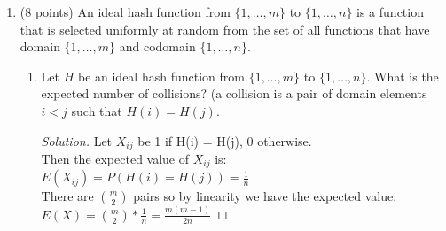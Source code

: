 \documentclass[10pt,letterpaper,unboxed,cm]{article}
\newenvironment{solution}
  {\begin{proof}[Solution]}
  {\end{proof}}
\begin{document}
\begin{enumerate}
\begin{enumerate}
\begin{solution}
\end{solution}

\item
What is the expected number of coin flips until you get a HHH?

(You can use a similar strategy for this problem)

\begin{solution}
    For this case the expected value is as follows:\\
    \(E(X) = \frac{1}{2}*E(X|T) + \frac{1}{4}*E(X|HT) + \frac{1}{8}*E(X|HHT) + \frac{1}{8}*E(X|HHH)\)\\
    \(E(X) = \frac{1}{2}(1 + E(X)) + \frac{1}{4}(2 + E(X)) + \frac{1}{8}(3 + E(X)) + \frac{1}{8}*3\)\\
    \(E(X) = \frac{E(X)}{2} + \frac{E(X)}{4} + \frac{E(X)}{8} + \frac{1}{2} + \frac{1}{2} + \frac{3}{8} + \frac{3}{8}\)\\
    \(\frac{E(X)}{8} = \frac{14}{8} \rightarrow \boxed{E(X) = 14}\)\\
    Again, we are just applying the same principle as in part a.
\end{solution}

\end{enumerate}

\item (8 points)
An ideal hash function from $\{1,\dots, m\}$ to $\{1,\dots, n\}$ is a function that is selected uniformly at random from the set of all functions that have domain $\{1,\dots, m\}$ and codomain $\{1,\dots, n\}$.

\begin{enumerate}
\item
Let $H$ be an ideal hash function from $\{1,\dots, m\}$ to $\{1,\dots, n\}$. What is the expected number of collisions? (a collision is a pair of domain elements $i<j$ such that $H(i) = H(j)$.

\begin{solution}
    
    Let $X_{ij}$ be 1 if H(i) = H(j), 0 otherwise.\\
    Then the expected value of $X_{ij}$ is:\\
    \(E(X_{ij}) = P(H(i) = H(j)) = \frac{1}{n}\)\\
    There are $\binom{m}{2}$ pairs so by linearity we have the expected value:\\
    \(E(X) = \binom{m}{2} * \frac{1}{n} = \boxed{\frac{m(m-1)}{2n}}\)
    
\end{solution}


\end{enumerate}
\end{enumerate}
\end{document}
